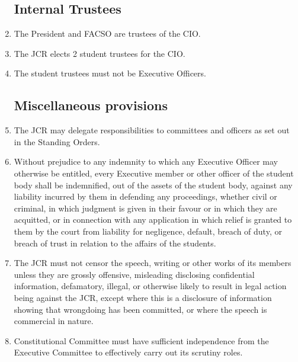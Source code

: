 \documentclass[12pt]{article}
\begin{document}
\begin{enumerate}
    \subsection{Internal Trustees}
    \item The President and FACSO are trustees of the CIO.
    \item The JCR elects 2 student trustees for the CIO.
    \item The student trustees must not be Executive Officers.

    \subsection{Miscellaneous provisions}
    \item The JCR may delegate responsibilities to committees and officers as set out in the Standing Orders.
    \item Without prejudice to any indemnity to which any Executive Officer may otherwise be entitled, every Executive member or other officer of the student body shall be indemnified, out of the assets of the student body, against any liability incurred by them in defending any proceedings, whether civil or criminal, in which judgment is given in their favour or in which they are acquitted, or in connection with any application in which relief is granted to them by the court from liability for negligence, default, breach of duty, or breach of trust in relation to the affairs of the students.
    \item The JCR must not censor the speech, writing or other works of its members unless they are grossly offensive, misleading disclosing confidential information, defamatory, illegal, or otherwise likely to result in legal action being against the JCR, except where this is a disclosure of information showing that wrongdoing has been committed, or where the speech is commercial in nature.
    \item Constitutional Committee must have sufficient independence from the Executive Committee to effectively carry out its scrutiny roles.
\end{enumerate}
\newpage
\end{document}
